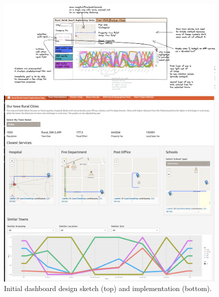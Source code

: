 \documentclass[letterpaper,inpress]{jdsart}
\begin{document}
\begin{figure}
\centering
\includegraphics[width=\textwidth]{Version1}

\includegraphics[width=.7\textwidth]{Version2}
\caption{Initial dashboard design sketch (top) and implementation (bottom).}\label{fig:v1}
\end{figure}
\end{document}
